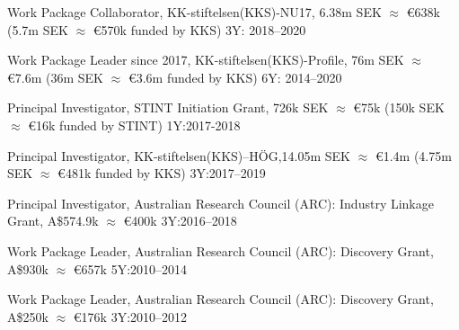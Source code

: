 \documentclass{stint-cv}
\begin{document}
\begin{cvItemize}
	{Work Package Collaborator, KK-stiftelsen(KKS)-NU17, 6.38m SEK $\approx$ \euro{638k} (5.7m SEK $\approx$ \euro{570k} funded by KKS)}
	{3Y: 2018--2020}
	
	{Work Package Leader since 2017, KK-stiftelsen(KKS)-Profile, 76m SEK $\approx$ \euro{7.6m} (36m SEK $\approx$ \euro{3.6m} funded by KKS)}
	{6Y: 2014--2020}
	
	
	{Principal Investigator, STINT Initiation Grant, 726k SEK $\approx$ \euro{75k} (150k SEK $\approx$ \euro{16k} funded by STINT)}
	{1Y:2017-2018}
	
	{Principal Investigator, KK-stiftelsen(KKS)--H{\"O}G,14.05m SEK $\approx$ \euro{1.4m} (4.75m SEK $\approx$ \euro{481k} funded by KKS)} {3Y:2017--2019}
	
	{Principal Investigator, Australian Research Council (ARC): Industry Linkage Grant, A\$574.9k $\approx$ \euro{400k}}
	{3Y:2016--2018}




	{Work Package Leader, Australian Research Council (ARC): Discovery Grant, A\$930k $\approx$ \euro{657k}}
	{5Y:2010--2014}
	
	{Work Package Leader, Australian Research Council (ARC): Discovery Grant, A\$250k $\approx$ \euro{176k}}
	{3Y:2010--2012}
	

\end{cvItemize}
\end{document}
